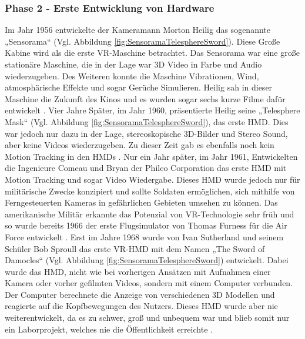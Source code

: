 \subsubsection{Phase 2 - Erste Entwicklung von Hardware}
Im Jahr 1956 entwickelte der Kameramann Morton Heilig das sogenannte „Sensorama“ (Vgl. Abbildung \ref{fig:SensoramaTelesphereSword}). Diese Große Kabine wird als die erste VR-Maschine betrachtet. Das Sensorama war eine große stationäre Maschine, die in der Lage war 3D Video in Farbe und Audio wiederzugeben. Des Weiteren konnte die Maschine Vibrationen, Wind, atmosphärische Effekte und sogar Gerüche Simulieren. Heilig sah in dieser Maschine die Zukunft des Kinos und es wurden sogar sechs kurze Filme dafür entwickelt \cite{20}.
\newline
Vier Jahre Später, im Jahr 1960, präsentierte Heilig seine „Telesphere Mask“ (Vgl. Abbildung \ref{fig:SensoramaTelesphereSword}), das erste HMD. Dies war jedoch nur dazu in der Lage, stereoskopische 3D-Bilder und Stereo Sound, aber keine Videos wiederzugeben. Zu dieser Zeit gab es ebenfalls noch kein Motion Tracking in den HMDs \cite{20}.
\newline
Nur ein Jahr später, im Jahr 1961, Entwickelten die Ingenieure Comeau und Bryan der Philco Corporation das erste HMD mit Motion Tracking und sogar Video Wiedergabe. Dieses HMD wurde jedoch nur für militärische Zwecke konzipiert und sollte Soldaten ermöglichen, sich mithilfe von Ferngesteuerten Kameras in gefährlichen Gebieten umsehen zu können. Das amerikanische Militär erkannte das Potenzial von VR-Technologie sehr früh und so wurde bereits 1966 der erste Flugsimulator von Thomas Furness für die Air Force entwickelt \cite{20}.
\newline
Erst im Jahre 1968 wurde von Ivan Sutherland und seinem Schüler Bob Sproull das erste VR-HMD mit dem Namen „The Sword of Damocles“ (Vgl. Abbildung \ref{fig:SensoramaTelesphereSword}) entwickelt. Dabei wurde das HMD, nicht wie bei vorherigen Ansätzen mit Aufnahmen einer Kamera oder vorher gefilmten Videos, sondern mit einem Computer verbunden. Der Computer berechnete die Anzeige von verschiedenen 3D Modellen und reagierte auf die Kopfbewegungen des Nutzers. Dieses HMD wurde aber nie weiterentwickelt, da es zu schwer, groß und unbequem war und blieb somit nur ein Laborprojekt, welches nie die Öffentlichkeit erreichte \cite{20}.
